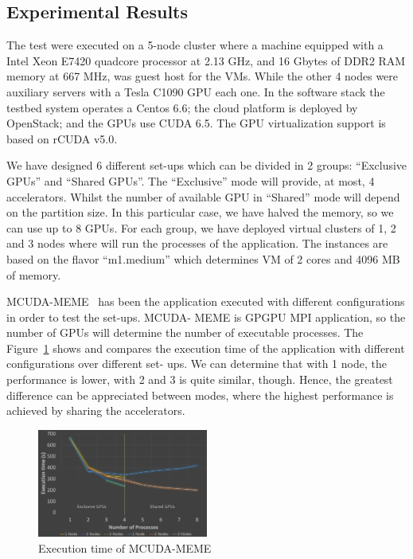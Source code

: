 \documentclass[a4paper,twoside]{article}
\begin{document}
\subsection{Experimental Results}
The test were executed on a 5-node cluster where a machine
equipped with a Intel Xeon E7420 quadcore processor at
2.13 GHz, and 16 Gbytes of DDR2 RAM memory at 667
MHz, was guest host for the VMs. While the other 4 nodes
were auxiliary servers with a Tesla C1090 GPU each one. 
In the software stack the testbed system operates a
Centos 6.6; the cloud platform is deployed by OpenStack; and
the GPUs use CUDA 6.5. The GPU virtualization support is
based on rCUDA v5.0.

We have designed 6 different set-ups which can be divided
in 2 groups: “Exclusive GPUs” and “Shared GPUs”. The
“Exclusive” mode will provide, at most, 4 accelerators. Whilst
the number of available GPU in “Shared” mode will depend
on the partition size. In this particular case, we have halved
the memory, so we can use up to 8 GPUs. For each group, we
have deployed virtual clusters of 1, 2 and 3 nodes where will
run the processes of the application. The instances are based
on the flavor “m1.medium” which determines VM of 2 cores
and 4096 MB of memory.

MCUDA-MEME~\cite{Liu2010} has been the application executed with
different configurations in order to test the set-ups. MCUDA-
MEME is GPGPU MPI application, so the number of GPUs
will determine the number of executable processes.
The Figure~\ref{fig3} shows and compares the execution time of
the application with different configurations over different set-
ups. We can determine that with 1 node, the performance is
lower, with 2 and 3 is quite similar, though. Hence, the greatest
difference can be appreciated between modes, where the
highest performance is achieved by sharing the accelerators.

\begin{figure}[htb]
  \centering
  \includegraphics[width=0.5\textwidth]{images/chart.jpg}
  \caption{Execution time of MCUDA-MEME}
  \label{fig3}
\end{figure}
\end{document}
